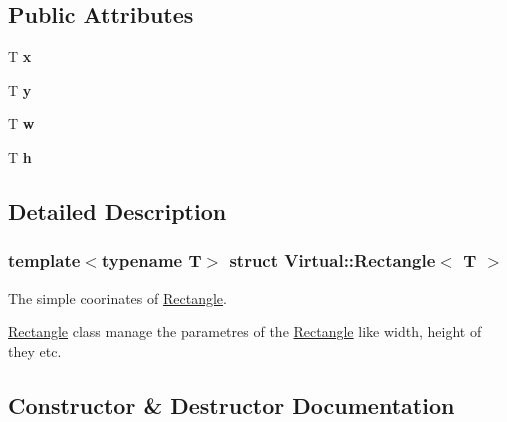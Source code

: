 \subsection*{Public Attributes}
\begin{DoxyCompactItemize}
\item 
\hypertarget{struct_virtual_1_1_rectangle_a767eced304189f1f9fc9a0c8b329a679}{}\label{struct_virtual_1_1_rectangle_a767eced304189f1f9fc9a0c8b329a679} 
T {\bfseries x}
\item 
\hypertarget{struct_virtual_1_1_rectangle_a0f392a2d77d2b91b2e65e4badd3f37aa}{}\label{struct_virtual_1_1_rectangle_a0f392a2d77d2b91b2e65e4badd3f37aa} 
T {\bfseries y}
\item 
\hypertarget{struct_virtual_1_1_rectangle_af60772870e4e51ffbce47f827d70e405}{}\label{struct_virtual_1_1_rectangle_af60772870e4e51ffbce47f827d70e405} 
T {\bfseries w}
\item 
\hypertarget{struct_virtual_1_1_rectangle_a3b60edf80bba3f7f48f0c57ad44b34ed}{}\label{struct_virtual_1_1_rectangle_a3b60edf80bba3f7f48f0c57ad44b34ed} 
T {\bfseries h}
\end{DoxyCompactItemize}


\subsection{Detailed Description}
\subsubsection*{template$<$typename T$>$\newline
struct Virtual\+::\+Rectangle$<$ T $>$}

The simple coorinates of \hyperlink{struct_virtual_1_1_rectangle}{Rectangle}. 

\hyperlink{struct_virtual_1_1_rectangle}{Rectangle} class manage the parametres of the \hyperlink{struct_virtual_1_1_rectangle}{Rectangle} like width, height of they etc. 

\subsection{Constructor \& Destructor Documentation}
\hypertarget{struct_virtual_1_1_rectangle_ae2d69ec79c6caf39973a5226995d5437}{}\label{struct_virtual_1_1_rectangle_ae2d69ec79c6caf39973a5226995d5437} 
